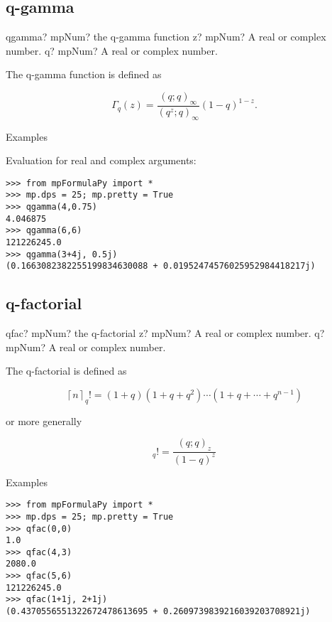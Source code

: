 \subsection{q-gamma}
\begin{mpFunctionsExtract}
	\mpFunctionTwo
	{qgamma? mpNum? the q-gamma function}
	{z? mpNum? A real or complex number.}
	{q? mpNum? A real or complex number.}		
\end{mpFunctionsExtract}

\vpara
The q-gamma function is defined as

\begin{equation}
\Gamma_q(z) = \frac{(q;q)_{\infty}}{(q^z;q)_{\infty}} (1-q)^{1-z}.
\end{equation}

Examples

Evaluation for real and complex arguments:

\begin{lstlisting}
>>> from mpFormulaPy import *
>>> mp.dps = 25; mp.pretty = True
>>> qgamma(4,0.75)
4.046875
>>> qgamma(6,6)
121226245.0
>>> qgamma(3+4j, 0.5j)
(0.1663082382255199834630088 + 0.01952474576025952984418217j)
\end{lstlisting}


\subsection{q-factorial}


\begin{mpFunctionsExtract}
	\mpFunctionTwo
	{qfac? mpNum? the  q-factorial}
	{z? mpNum? A real or complex number.}
	{q? mpNum? A real or complex number.}		
\end{mpFunctionsExtract}


The q-factorial is defined as

\begin{equation}
\left\lceil n \right\rceil_q! = (1+q)(1+q+q^2)\cdots(1+q+\cdots+q^{n-1})
\end{equation}

or more generally

\begin{equation}
[z]_q! = \frac{(q;q)_z}{(1-q)^z}
\end{equation}

Examples

\begin{lstlisting}
>>> from mpFormulaPy import *
>>> mp.dps = 25; mp.pretty = True
>>> qfac(0,0)
1.0
>>> qfac(4,3)
2080.0
>>> qfac(5,6)
121226245.0
>>> qfac(1+1j, 2+1j)
(0.4370556551322672478613695 + 0.2609739839216039203708921j)
\end{lstlisting}


